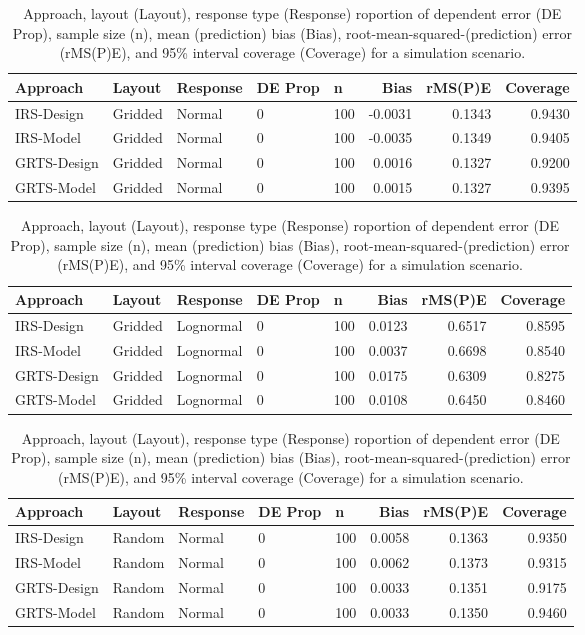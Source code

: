 \documentclass[]{elsarticle} %
\begin{document}
\begin{table}[ht]
\centering
\begin{tabular}{lllllrrr}
  \hline
Approach & Layout & Response & DE Prop & n & Bias & rMS(P)E & Coverage \\ 
  \hline
IRS-Design & Gridded & Normal & 0 & 100 & -0.0031 & 0.1343 & 0.9430 \\ 
  IRS-Model & Gridded & Normal & 0 & 100 & -0.0035 & 0.1349 & 0.9405 \\ 
  GRTS-Design & Gridded & Normal & 0 & 100 & 0.0016 & 0.1327 & 0.9200 \\ 
  GRTS-Model & Gridded & Normal & 0 & 100 & 0.0015 & 0.1327 & 0.9395 \\ 
   \hline
\end{tabular}
\caption{Approach, layout (Layout), response type (Response) roportion of dependent error (DE Prop), sample size (n), mean (prediction) bias (Bias), root-mean-squared-(prediction) error (rMS(P)E), and 95\% interval coverage (Coverage) for a simulation scenario.} 
\end{table}
\begin{table}[ht]
\centering
\begin{tabular}{lllllrrr}
  \hline
Approach & Layout & Response & DE Prop & n & Bias & rMS(P)E & Coverage \\ 
  \hline
IRS-Design & Gridded & Lognormal & 0 & 100 & 0.0123 & 0.6517 & 0.8595 \\ 
  IRS-Model & Gridded & Lognormal & 0 & 100 & 0.0037 & 0.6698 & 0.8540 \\ 
  GRTS-Design & Gridded & Lognormal & 0 & 100 & 0.0175 & 0.6309 & 0.8275 \\ 
  GRTS-Model & Gridded & Lognormal & 0 & 100 & 0.0108 & 0.6450 & 0.8460 \\ 
   \hline
\end{tabular}
\caption{Approach, layout (Layout), response type (Response) roportion of dependent error (DE Prop), sample size (n), mean (prediction) bias (Bias), root-mean-squared-(prediction) error (rMS(P)E), and 95\% interval coverage (Coverage) for a simulation scenario.} 
\end{table}
\begin{table}[ht]
\centering
\begin{tabular}{lllllrrr}
  \hline
Approach & Layout & Response & DE Prop & n & Bias & rMS(P)E & Coverage \\ 
  \hline
IRS-Design & Random & Normal & 0 & 100 & 0.0058 & 0.1363 & 0.9350 \\ 
  IRS-Model & Random & Normal & 0 & 100 & 0.0062 & 0.1373 & 0.9315 \\ 
  GRTS-Design & Random & Normal & 0 & 100 & 0.0033 & 0.1351 & 0.9175 \\ 
  GRTS-Model & Random & Normal & 0 & 100 & 0.0033 & 0.1350 & 0.9460 \\ 
   \hline
\end{tabular}
\caption{Approach, layout (Layout), response type (Response) roportion of dependent error (DE Prop), sample size (n), mean (prediction) bias (Bias), root-mean-squared-(prediction) error (rMS(P)E), and 95\% interval coverage (Coverage) for a simulation scenario.} 
\end{table}
\end{document}

